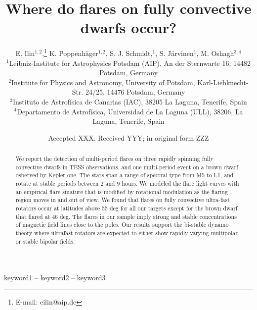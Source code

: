 \documentclass[fleqn,usenatbib,letters]{mnras}%
\title[Where do flares on fully convective dwarfs occur?]{Where do flares on fully convective dwarfs occur?}
\author[E. Ilin et al.]{
E. Ilin$^{1,2}$,\thanks{E-mail: eilin@aip.de}
K. Poppenh\"ager$^{1,2}$,
S. J. Schmidt,$^{1}$,
S. J\"arvinen$^{1}$,
M. Oshagh$^{3,4}$
\\
$^{1}$Leibniz-Institute for Astrophysics Potsdam (AIP), An der Sternwarte 16, 14482 Potsdam, Germany\\
$^{2}$Institute for Physics and Astronomy, University of Potsdam, Karl-Liebknecht-Str. 24/25, 14476 Potsdam, Germany\\
$^{3}$Instituto de Astrof\'isica de Canarias (IAC), 38205 La Laguna, Tenerife, Spain\\
$^{4}$Departamento de Astrof\'isica, Universidad de La Laguna (ULL), 38206, La Laguna, Tenerife, Spain
}
\date{Accepted XXX. Received YYY; in original form ZZZ}
\begin{document}
\label{firstpage}
\pagerange{\pageref{firstpage}--\pageref{lastpage}}
\maketitle

\begin{abstract}
We report the detection of multi-period flares on three rapidly spinning fully convective dwarfs in TESS observations, and one multi-period event on a brown dwarf osberved by Kepler one. The stars span a range of spectral type from M5 to L1, and rotate at stable periods between 2 and 9 hours. We modeled the flare light curves with an empirical flare sinature that is modified by rotational modulation as the flaring region moves in and out of view. We found that flares on fully convective ultra-fast rotators occur at latitudes above 55 deg for all our targets except for the brown dwarf that flared at 46 deg. The flares in our sample imply strong and stable concentrations of magnetic field lines close to the poles. Our results support the bi-stable dynamo theory where ultrafast rotators are expected to either show rapidly varying multipolar, or stable bipolar fields. 
\end{abstract}

\begin{keywords}
keyword1 -- keyword2 -- keyword3
\end{keywords}




\end{document}
